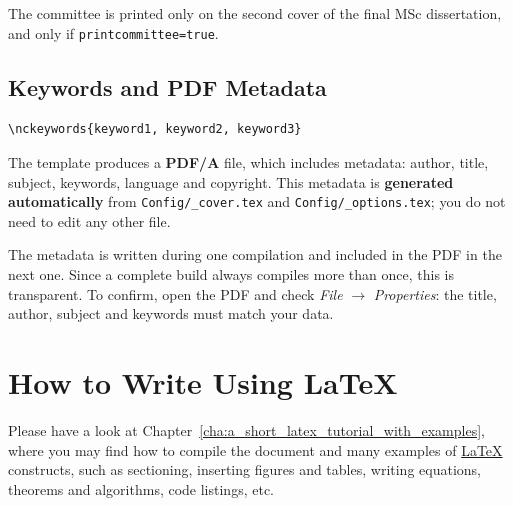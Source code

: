 The committee is printed only on the second cover of the final MSc dissertation, and only if \texttt{printcommittee=true}.

\subsection{Keywords and PDF Metadata} %
\label{ssec:keywords_metadata}

\begin{Verbatim}[breaklines=true, breakanywhere=true]
% Keywords for the PDF metadata (comma-separated, same as in the abstract)
\nckeywords{keyword1, keyword2, keyword3}
\end{Verbatim}

The template produces a \textbf{PDF/A} file, which includes metadata: author, title, subject, keywords, language and copyright. This metadata is \textbf{generated automatically} from \texttt{Config/\_cover.tex} and \texttt{Config/\_options.tex}; you do not need to edit any other file.

The metadata is written during one compilation and included in the PDF in the next one. Since a complete build always compiles more than once, this is transparent. To confirm, open the PDF and check \emph{File} $\rightarrow$ \emph{Properties}: the title, author, subject and keywords must match your data.

\section{How to Write Using \LaTeX} %
\label{sec:how_to_write_using_latex}

Please have a look at Chapter~\ref{cha:a_short_latex_tutorial_with_examples}, where you may find how to compile the document and many examples of \href{http://tobi.oetiker.ch/lshort/lshort.pdf}{\LaTeX} constructs, such as sectioning, inserting figures and tables, writing equations, theorems and algorithms, code listings, etc.
